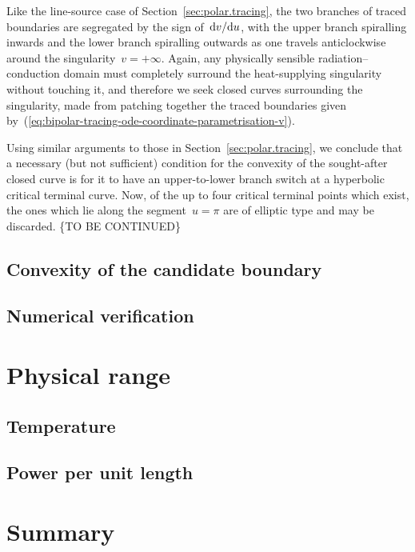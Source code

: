 Like the line-source case of Section~\ref{sec:polar.tracing},
the two branches of traced boundaries are segregated
by the sign of~$\mathop{}\!\mathrm{d} v / {\mathop{}\!\mathrm{d} u}$,
with the upper branch spiralling inwards
and the lower branch spiralling outwards
as one travels anticlockwise
around the singularity~$v = +\infty$.
Again, any physically sensible radiation--conduction domain
must completely surround the heat-supplying singularity without touching it,
and therefore we seek closed curves surrounding the singularity,
made from patching together the traced boundaries
given by~(\ref{eq:bipolar-tracing-ode-coordinate-parametrisation-v}).

Using similar arguments to those in Section~\ref{sec:polar.tracing},
we conclude that a necessary (but not sufficient) condition
for the convexity of the sought-after closed curve
is for it to have an upper-to-lower branch switch
at a hyperbolic critical terminal curve.
Now, of the up to four critical terminal points which exist,
the ones which lie along the segment~$u = \pi$
are of elliptic type and may be discarded.
\{TO BE CONTINUED\}

\subsection{Convexity of the candidate boundary}
\label{sec:bipolar.tracing.convex}


\subsection{Numerical verification}
\label{sec:bipolar.tracing.verification}


\section{Physical range}
\label{sec:bipolar.physical}


\subsection{Temperature}
\label{sec:bipolar.physical.temperature}


\subsection{Power per unit length}
\label{sec:bipolar.physical.power}


\section{Summary}
\label{sec:bipolar.summary}

